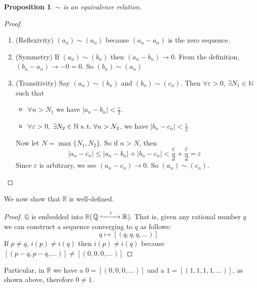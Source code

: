 \documentclass[12pt]{amsart}
\newcommand{\bbR}{\mathbb{R}}
\newcommand{\bbN}{\mathbb{N}}
\newcommand{\bbQ}{\mathbb{Q}}
\newcommand{\suchthat}{\operatorname{\thinspace s.t. \thinspace}}
\theoremstyle{plain}
\newtheorem*{prop}{Proposition}
\theoremstyle{remark}
\theoremstyle{definition}
\begin{document}
\begin{prop}
	$\sim$ is an equivalence relation.
\end{prop}
\begin{proof}
\hfill
\newline
	\begin{enumerate}
		\item (Reflexivity)
			$(a_n) \sim (a_n)$ because $(a_n - a_n)$ is the zero sequence.
		\item (Symmetry)
		If $(a_n) \sim (b_n)$ then $(a_n - b_n) \rightarrow 0$. From the definition, $(b_n - a_n) \rightarrow -0 = 0$. So $(b_n)\sim (a_n)$
		\item (Transitivity)
			Say $(a_n) \sim (b_n)$ and $(b_n) \sim (c_n)$. Then $\forall \varepsilon > 0$, $ \exists N_1 \in \bbN $ such that
			\begin{itemize}[-]
				\item 
					$\forall n > N_1$ we have $|a_n - b_n| < \frac{\varepsilon}{2}$.
				\item
					$\forall \varepsilon > 0$, $\exists N_2 \in \bbN \suchthat \forall n > N_2$, we have $|b_n - c_n| < \frac{\varepsilon}{2}$
			\end{itemize}
			Now let $N = \max\{N_1, N_2\}$. So if $n > N$, then 
			\begin{equation*}
				|a_n - c_n| \leqslant |a_n - b_n| + |b_n - c_n| < \frac{\varepsilon}{2} + \frac{\varepsilon}{2} = \varepsilon
			\end{equation*}
			Since $\varepsilon$ is arbitrary, we see $(a_n - c_n) \rightarrow 0$. So $(a_n) \sim (c_n)$.
	\end{enumerate}
\end{proof}

\par
We now show that $\bbR$ is well-defined.
\begin{proof}
		$\bbQ$ is embedded into $\bbR$($\bbQ \xhookrightarrow[]{\quad i\quad} \bbR$). That is, given any rational number $q$ we can construct a sequence converging to $q$ as follows:
		\begin{equation*}
			q \mapsto [(q,q,q,\dots)]
		\end{equation*}
		If $p \neq q$, $i(p) \neq i(q)$ then $i(p) \neq i(q)$ because $[(p - q, p - q,\dots)] \neq [(0,0,0,\dots)]$
\end{proof}

Particular, in $\bbR$ we have a $0 = [(0,0,0,\dots)]$ and a $1 = [(1,1,1,1,\dots)]$, as shown above, therefore $0 \neq 1$.
\end{document}
